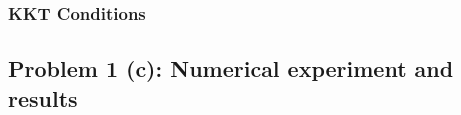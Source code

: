 \documentclass[a4paper,10pt]{article}
\begin{document}
\subsubsection{KKT Conditions}

\subsection{Problem 1 (c): Numerical experiment and results}
\end{document}
